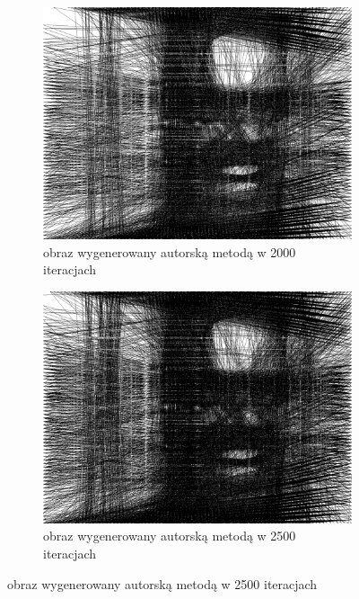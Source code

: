 \documentclass[a4paper, 12pt, polish, twoside]{extreport}
\begin{document}
\begin{figure}[H]
\begin{subfigure}{0.24\textwidth}
        \label{comp-comp-joker-shining-f}
    \end{subfigure}
    \begin{subfigure}{0.24\textwidth}
        \centering
        \includegraphics[width = \textwidth]{img/6-comp/shining_r_i2000_c20_inv0_bg10_obj1_ed1.png}
        \caption{obraz wygenerowany autorską metodą w 2000 iteracjach}
        \label{comp-comp-joker-shining-g}
    \end{subfigure}
    \begin{subfigure}{0.24\textwidth}
        \centering
        \includegraphics[width = \textwidth]{img/6-comp/shining_r_i2500_c20_inv0_bg10_obj1_ed1.png}
        \caption{obraz wygenerowany autorską metodą w 2500 iteracjach}

\end{subfigure}
\end{figure}
\end{document}
